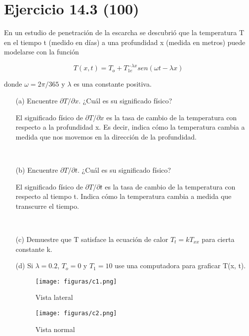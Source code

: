\section{Ejercicio 14.3 (100)}

En un estudio de penetración de la escarcha se descubrió
que la temperatura T en el tiempo t (medido en días) a una profundidad x (medida en metros) puede modelarse con la función

\[T(x, t) = T_{o} + T_{1e}^{-\lambda x} sen(\omega t-\lambda x) \]

donde \(\omega = 2\pi / 365\) y \(\lambda \) es una constante positiva.

\begin{enumerate}
    \item[(a)] Encuentre \(\partial T / \partial x\). ¿Cuál es su significado físico?
    
    \[\]
    El significado físico de \(\partial T / \partial x\) es la tasa de cambio de la temperatura con respecto a la profundidad x. Es decir, indica cómo la temperatura cambia a medida que nos movemos en la dirección de la profundidad.

    \

    \item[(b)] Encuentre \(\partial T / \partial t\). ¿Cuál es su significado físico?
    
    El significado físico de \(\partial T / \partial t\) es la tasa de cambio de la temperatura con respecto al tiempo t. Indica cómo la temperatura cambia a medida que transcurre el tiempo.

    \
    
    \item[(c)] Demuestre que T satisface la ecuación de calor \(T_{t} = kT_{xx}\) para cierta constante k.
    
    
    
    \item[(d)] Si \(\lambda = 0.2\), \(T_{o} = 0\) y \(T_{1} = 10\) use una computadora para graficar T(x, t).
    
    \begin{figure}[h]
    \centering
    \texttt{[image: figuras/c1.png]}
    \caption{Vista lateral}
    \label{fig:enter-label}
    \end{figure}

    \begin{figure}[h]
    \centering
    \texttt{[image: figuras/c2.png]}
    \caption{Vista normal}
    \label{fig:enter-label}
    \end{figure}
    

\end{enumerate}
